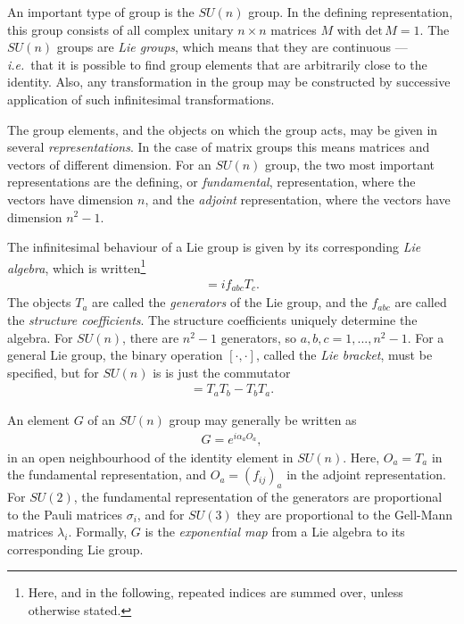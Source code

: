 \documentclass[twoside,english]{uiofysmaster}
\begin{document}
An important type of group is the $SU(n)$ group. In the defining representation, this group consists of all complex unitary $n\times n$ matrices $M$ with $\mathrm{det}\,M=1$. The $SU(n)$ groups are {\it Lie groups}, which means that they are continuous --- {\it i.e.}\ that it is possible to find group elements that are arbitrarily close to the identity. Also, any transformation in the group may be constructed by successive application of such infinitesimal transformations. 

The group elements, and the objects on which the group acts, may be given in several {\it representations}. In the case of matrix groups this means matrices and vectors of different dimension. For an $SU(n)$ group, the two most important representations are the defining, or {\it fundamental}, representation, where the vectors have dimension $n$, and the {\it adjoint} representation, where the vectors have dimension $n^2-1$.

The infinitesimal behaviour of a Lie group is given by its corresponding {\it Lie algebra}, which is written\footnote{Here, and in the following, repeated indices are summed over, unless otherwise stated.} 
\begin{align}
	[T_a, T_b] = i f_{abc}T_c.
\end{align}
The objects $T_a$ are called the {\it generators} of the Lie group, and the $f_{abc}$ are called the {\it structure coefficients}. The structure coefficients uniquely determine the algebra. For $SU(n)$, there are $n^2 - 1$ generators, so $a,b,c =1,...,n^2-1$. For a general Lie group, the binary operation $[\cdot , \cdot ]$, called the {\it Lie bracket}, must be specified, but for $SU(n)$ is is just the commutator
\begin{align}
	[T_a, T_b] = T_aT_b - T_bT_a.
\end{align}

An element $G$ of an $SU(n)$ group may generally be written as
\begin{align}
	G = e^{i\alpha_a O_a},\label{eq:global_gauge_transformation}
\end{align}
in an open neighbourhood of the identity element in $SU(n)$. Here, $O_a = T_a$ in the fundamental representation, and $O_a = (f_{ij})_{a}$ in the adjoint representation. For $SU(2)$, the fundamental representation of the generators are proportional to the Pauli matrices $\sigma_i$, and for $SU(3)$ they are proportional to the Gell-Mann matrices $\lambda_i$. Formally, $G$ is the {\it exponential map} from a Lie algebra to its corresponding Lie group. 
\end{document}
